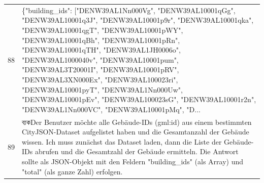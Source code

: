 \documentclass[a4paper,11pt]{article}
\begin{document}
\begin{table}[ht]
\begin{tabular}{r p{12cm}}
88 & \{"building\_ids": ["DENW39AL1Nn000Vg", "DENW39AL10001qGg", "DENW39AL10001q3J", "DENW39AL10001p9r", "DENW39AL10001qka", "DENW39AL10001qgT", "DENW39AL10001pWY", "DENW39AL10001qBh", "DENW39AL10001pRn", "DENW39AL10001qTH", "DENW39AL1JH0006o", "DENW39AL1000040v", "DENW39AL10001pum", "DENW39AL3T20001I", "DENW39AL10001pRV", "DENW39AL3XN000Ex", "DENW39AL100023ri", "DENW39AL10001pyT", "DENW39AL1Nn000Uw", "DENW39AL10001pEv", "DENW39AL100023sG", "DENW39AL10001r2n", "DENW39AL1Nn000VC", "DENW39AL10001pMq", "D... \\
89 &  ব্যকDer Benutzer möchte alle Gebäude-IDs (gml:id) aus einem bestimmten CityJSON-Dataset aufgelistet haben und die Gesamtanzahl der Gebäude wissen. Ich muss zunächst das Dataset laden, dann die Liste der Gebäude-IDs abrufen und die Gesamtzahl der Gebäude ermitteln. Die Antwort sollte als JSON-Objekt mit den Feldern "building\_ids" (als Array) und "total" (als ganze Zahl) erfolgen.


\end{tabular}
\end{table}
\end{document}
